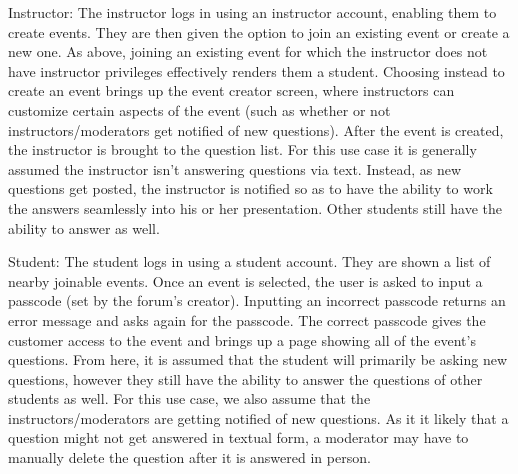 \documentclass[12pt]{article}
\begin{document}
\begin{flushleft}
Instructor: The instructor logs in using an instructor account, enabling them to create events. They are then given the option to join an existing event or create a new one. As above, joining an existing event for which the instructor does not have instructor privileges effectively renders them a student. Choosing instead to create an event brings up the event creator screen, where instructors can customize certain aspects of the event (such as whether or not instructors/moderators get notified of new questions). After the event is created, the instructor is brought to the question list. For this use case it is generally assumed the instructor isn't answering questions via text. Instead, as new questions get posted, the instructor is notified so as to have the ability to work the answers seamlessly into his or her presentation. Other students still have the ability to answer as well.
\end{flushleft}

\begin{flushleft}
Student: The student logs in using a student account. They are shown a list of nearby joinable events. Once an event is selected, the user is asked to input a passcode (set by the forum's creator). Inputting an incorrect passcode returns an error message and asks again for the passcode. The correct passcode gives the customer access to the event and brings up a page showing all of the event's questions. From here, it is assumed that the student will primarily be asking new questions, however they still have the ability to answer the questions of other students as well. For this use case, we also assume that the instructors/moderators are getting notified of new questions. As it it likely that a question might not get answered in textual form, a moderator may have to manually delete the question after it is answered in person.
\end{flushleft}
\end{document}
